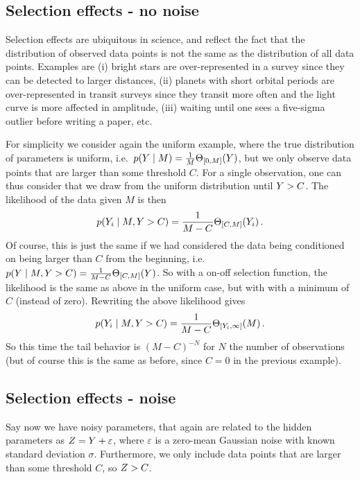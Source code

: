 \documentclass[12pt,a4paper]{article}
\begin{document}
\subsection{Selection effects - no noise}
Selection effects are ubiquitous in science, and reflect the fact that the distribution of observed data points is not the same as the distribution of all data points. 
Examples are (i) bright stars are over-represented in a survey since they can be detected to larger distances, (ii) planets with short orbital periods are over-represented in transit surveys since they transit more often and the light curve is more affected in amplitude, (iii) waiting until one sees a five-sigma outlier before writing a paper, etc. 

For simplicity we consider again the uniform example, where the true distribution of parameters is uniform, i.e.~$p(Y\mid M) = \frac{1}{M}\Theta_{[0,M]}(Y)$, but we only observe data points that are larger than some threshold $C$.
For a single observation, one can thus consider that we draw from the uniform distribution until $Y > C$.
The likelihood of the data given $M$ is then
\[
    p(Y_i \mid M, Y > C) = \frac{1}{M - C}\Theta_{[C,M]}(Y_i)
     \,.
\]
Of course, this is just the same if we had considered the data being conditioned on being larger than $C$ from the beginning, i.e.~$p(Y\mid M, Y > C) = \frac{1}{M - C}\Theta_{[C,M]}(Y)$.
So with a on-off selection function, the likelihood is the same as above in the uniform case, but with with a minimum of $C$ (instead of zero).
Rewriting the above likelihood gives
\[
    p(Y_i \mid M, Y > C) = \frac{1}{M - C}\Theta_{[Y_i, \infty]}(M)
    \,.
\]
So this time the tail behavior is $(M - C) ^ {- N}$ for $N$ the number of observations (but of course this is the same as before, since $C = 0$ in the previous example).


\subsection{Selection effects - noise}

Say now we have noisy parameters, that again are related to the hidden parameters as $Z = Y + \varepsilon$, where $\varepsilon$ is a zero-mean Gaussian noise with known standard deviation $\sigma$.
Furthermore, we only include data points that are larger than some threshold $C$, so $Z > C$.
\end{document}
